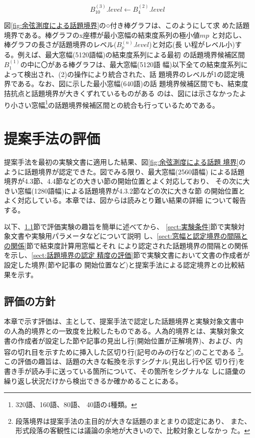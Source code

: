 \[ B^{(3)}_{10}.level ← B^{(2)}_4.level \]

図\ref{fig:余弦測度による話題境界}の○付き棒グラフは、このようにして求
めた話題境界である。棒グラフのx座標が最小窓幅の結束度系列の極小値$mp$
と対応し、棒グラフの長さが話題境界のレベル($B^{(n)}_p.level$)と対応(長
い程がレベル小)する。例えば、最大窓幅(5120語幅)の結束度系列による最初
の話題境界候補区間$B^{(1)}_1$の中に〇がある棒グラフは、最大窓幅(5120語
幅)以下全ての結束度系列によって検出され、(2)の操作により統合された、話
題境界のレベルが1の認定境界である。なお、図に示した最小窓幅(640語)の話
題境界候補区間でも、結束度拮抗点と話題境界が大きくずれているものがある
のは、図には示さなかったより小さい窓幅\footnote{320語、160語、80語、
  40語の4種類。}の話題境界候補区間との統合も行っているためである。

\section{提案手法の評価}
\label{sect:評価実験}

提案手法を最初の実験文書に適用した結果、図\ref{fig:余弦測度による話題
  境界}のように話題境界が認定できた。図でみる限り、最大窓幅(2560語幅)
による話題境界が4.3節、4.4節などの大きい節の開始位置とよく対応しており、
その次に大きい窓幅(1280語幅)による話題境界が4.3.2節などの次に大きな節
の開始位置とよく対応している。本章では、図からは読みとり難い結果の詳細
について報告する。

以下、\ref{sect:評価方針}節で評価実験の趣旨を簡単に述べてから、
\ref{sect:実験条件}節で実験対象文書や実験用パラメータなどについて説明
し、\ref{sect:窓幅と認定境界の間隔との関係}節で結束度計算用窓幅とそれ
により認定された話題境界の間隔との関係を示し、\ref{sect:話題境界の認定
  精度の評価}節で実験文書において文書の作成者が設定した境界(節や記事の
開始位置など)と提案手法による認定境界との比較結果を示す。


\subsection{評価の方針}
\label{sect:評価方針}

本章で示す評価は、主として、提案手法で認定した話題境界と実験対象文書中
の人為的境界との一致度を比較したものである。人為的境界とは、実験対象文
書の作成者が設定した節や記事の見出し行(開始位置が正解境界)、および、内
容の切れ目を示すために挿入した区切り行(記号のみの行など)のことである
\footnote{段落境界は提案手法の主目的が大きな話題のまとまりの認定にあり、
  また、形式段落の客観性には議論の余地が大きいので、比較対象としなかっ
  た。}。この評価の趣旨は、話題の大きな転換を示すシグナル(見出し行や区
切り行)を書き手が読み手に送っている箇所について、その箇所をシグナルな
しに語彙の繰り返し状況だけから検出できるか確かめることにある。

